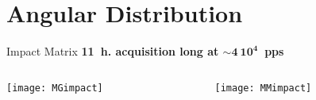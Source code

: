 \section{Angular Distribution}

\begin{frame}{Impact Matrix}
	\centering
	\vspace{-0.05\textheight}
	\textbf{11~h. acquisition long at $\mathbf{\sim 4\ 10^{4}}$~pps}
	\vspace{0.05\textheight}
	\begin{columns}
		\begin{column}{0.5\textwidth}
			\begin{overlayarea}{\textwidth}{\textheight}
				\centering
				\texttt{[image: MGimpact]}
			\end{overlayarea}
		\end{column}
		\begin{column}{0.5\textwidth}
			\begin{overlayarea}{\textwidth}{\textheight}
				\centering       
				\texttt{[image: MMimpact]}\\
		    \end{overlayarea}	
		\end{column}
	\end{columns}
\end{frame}